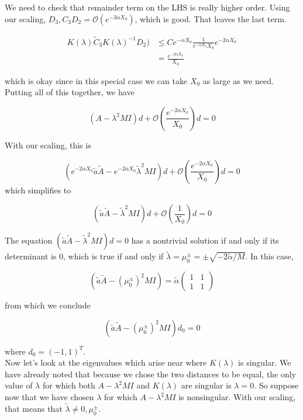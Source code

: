 \documentclass[12pt]{article}
\begin{document}
We need to check that remainder term on the LHS is really higher order. Using our scaling, $D_3, C_3 D_2 = \mathcal{O}(e^{-3 \alpha X_0})$, which is good. That leaves the last term.

\begin{align*}
K(\lambda) \tilde{C}_3 K(\lambda)^{-1} D_2) &\leq
C e^{-\alpha X_0} \frac{1}{e^{-\alpha X_0}X_0} e^{-2 \alpha X_0} \\
&= \frac{e^{-2 \alpha X_0}}{X_0}
\end{align*}

which is okay since in this special case we can take $X_0$ as large as we need. Putting all of this together, we have 

\[
(A - \lambda^2 MI )d + \mathcal{O}\left( \frac{e^{-2 \alpha X_0}}{X_0} \right) d = 0
\]

With our scaling, this is

\[
(e^{-2\alpha X_0} \tilde{a} \tilde{A} - e^{-2 \alpha X_0} \tilde{\lambda}^2 M I )d + \mathcal{O}\left( \frac{e^{-2 \alpha X_0}}{X_0} \right) d = 0
\]
which simplifies to

\[
(\tilde{a} \tilde{A} - \tilde{\lambda}^2 M I )d + \mathcal{O}\left( \frac{1}{X_0} \right) d = 0
\]

The equation $(\tilde{a} \tilde{A} - \tilde{\lambda}^2 M I )d = 0$ has a nontrivial solution if and only if its determinant is 0, which is true if and only if $\tilde{\lambda} = \mu_0^\pm = \pm \sqrt{-2 \tilde{\alpha}/M}$. In this case, 

\[
(\tilde{a} \tilde{A} - (\mu_0^\pm)^2 M I ) = \tilde{\alpha}
\begin{pmatrix}1 & 1 \\ 1 & 1 \end{pmatrix}
\]

from which we conclude 

\[
(\tilde{a} \tilde{A} - (\mu_0^\pm)^2 M I ) d_0 = 0
\]

where $d_0 = (-1, 1)^T$.\\

Now let's look at the eigenvalues which arise near where $K(\lambda)$ is singular. We have already noted that because we chose the two distances to be equal, the only value of $\lambda$ for which both $A - \lambda^2 M I$ and $K(\lambda)$ are singular is $\lambda = 0$. So suppose now that we have chosen $\lambda$ for which $A - \lambda^2 M I$ is nonsingular. With our scaling, that means that $\tilde{\lambda} \neq 0, \mu_0^\pm$. \\
\end{document}
